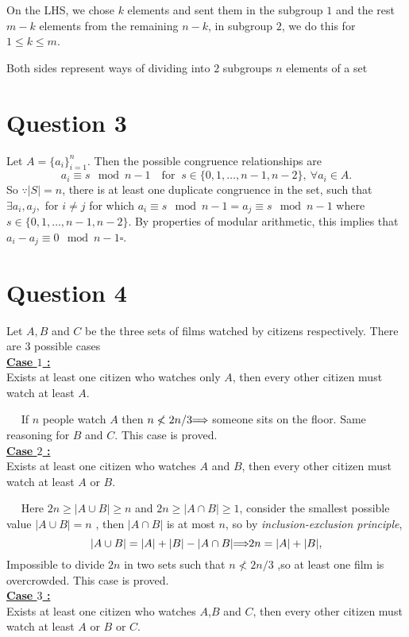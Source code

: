 \documentclass[12pt]{article}
\let\oldimplies\implies
\renewcommand*{\implies}{
	\hspace{-0.05cm}\resizebox{.95\width}{\height}{$\oldimplies$}\hspace{-0.05cm}
}
\begin{document}
		
		On the LHS, we chose $k$ elements and sent them in the subgroup $1$ and the rest $m-k$ elements from the remaining $n-k$, in subgroup $2$, we do this for $1 \le k \le m$. 
		
		
		Both sides represent ways of dividing into $2$ subgroups $n$ elements of a set 
	\section*{Question 3}
		Let $A = \{a_i\}_{i=1}^{n}$. Then the possible congruence relationships are 
		$$ a_i \equiv s \mod n-1 \quad \text{for }\ s \in \{0,1, \dots ,n-1,n-2\}, \ \forall a_{i} \in A.$$
		So $\because |S|=n$, there is at least one duplicate congruence in the set, such that $\exists a_{i}, a_{j} , $ for $i\neq j$ for which $a_{i} \equiv s \mod n-1 = a_{j} \equiv s \mod n-1$ where $s \in \{0,1,\dots, n-1,n-2\}$. By properties of modular arithmetic, this implies that $a_{i} - a_{j} \equiv 0 \mod n-1 \square$.
	\section*{Question 4}
		Let $A,B$ and $C$ be the three sets of films watched by citizens respectively. There are $3$ possible cases \\
		
		\noindent \underline{\textbf{Case $1$ :}} \\
		Exists at least one citizen who watches only $A$, then every other citizen must watch at least $A$. 
		
		$\quad$ If $n$ people watch $A$ then $n \nless 2n/3 \implies$ someone sits on the floor. Same reasoning for $B$ and $C$. This case is proved.\\
		
		\noindent \underline{\textbf{Case $2$ :}} \\
		Exists at least one citizen who watches $A$ and $B$, then every other citizen must watch at least $A$ or $B$.
		
		$\quad$ Here $ 2n \ge |A \cup B| \ge n$  and $2n \ge |A \cap B| \ge 1$, consider the smallest possible value $|A \cup B|= n$ , then $|A \cap B|$ is at most $n$, so by \emph{inclusion-exclusion principle}, 
		$$ |A \cup B| = |A| + |B| - |A \cap B| \implies 2n = |A| + |B|,$$
		Impossible to divide $2n$ in two sets such that $n \nless 2n/3$ ,so at least one film is overcrowded. This case is proved.\\
		
		\noindent \underline{\textbf{Case $3$ :}} \\
		Exists at least one citizen who watches $A$,$B$ and $C$, then every other citizen must watch at least $A$ or $B$ or $C$.
		
\end{document}
